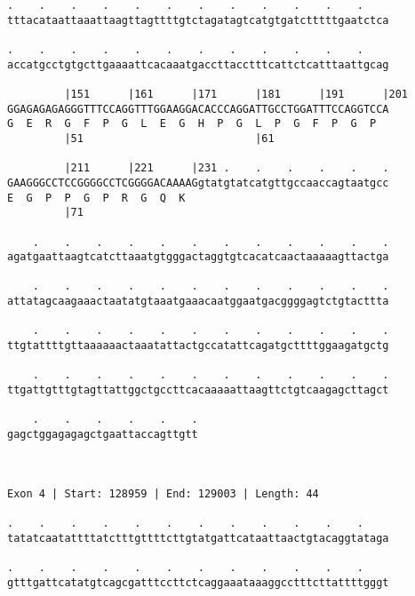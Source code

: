 \documentclass{article}
\begin{document}
\begin{Verbatim}
.    .    .    .    .    .    .    .    .    .    .    .    
tttacataattaaattaagttagttttgtctagatagtcatgtgatctttttgaatctca
                                                            
.    .    .    .    .    .    .    .    .    .    .    .    
accatgcctgtgcttgaaaattcacaaatgaccttacctttcattctcatttaattgcag
                                                            
         |151      |161      |171      |181      |191      |201
GGAGAGAGAGGGTTTCCAGGTTTGGAAGGACACCCAGGATTGCCTGGATTTCCAGGTCCA
G  E  R  G  F  P  G  L  E  G  H  P  G  L  P  G  F  P  G  P  
         |51                           |61                  
  
         |211      |221      |231 .    .    .    .    .    .
GAAGGGCCTCCGGGGCCTCGGGGACAAAAGgtatgtatcatgttgccaaccagtaatgcc
E  G  P  P  G  P  R  G  Q  K                                
         |71                                                
  
    .    .    .    .    .    .    .    .    .    .    .    .
agatgaattaagtcatcttaaatgtgggactaggtgtcacatcaactaaaaagttactga
                                                            
    .    .    .    .    .    .    .    .    .    .    .    .
attatagcaagaaactaatatgtaaatgaaacaatggaatgacggggagtctgtacttta
                                                            
    .    .    .    .    .    .    .    .    .    .    .    .
ttgtattttgttaaaaaactaaatattactgccatattcagatgcttttggaagatgctg
                                                            
    .    .    .    .    .    .    .    .    .    .    .    .
ttgattgtttgtagttattggctgccttcacaaaaattaagttctgtcaagagcttagct
                                                            
    .    .    .    .    .    .
gagctggagagagctgaattaccagttgtt
                              
                              
 
Exon 4 | Start: 128959 | End: 129003 | Length: 44
 
.    .    .    .    .    .    .    .    .    .    .    .    
tatatcaatattttatctttgttttcttgtatgattcataattaactgtacaggtataga
                                                            
.    .    .    .    .    .    .    .    .    .    .    .    
gtttgattcatatgtcagcgatttccttctcaggaaataaaggcctttcttattttgggt
                                                            

\end{Verbatim}
\end{document}
